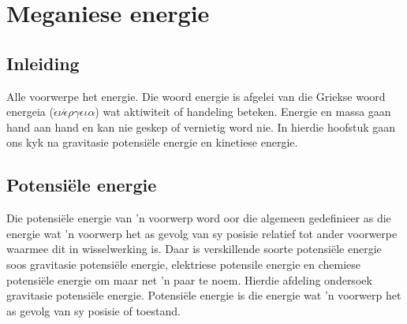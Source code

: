 \chapter{Meganiese energie} \label{chap:energy}
    \setcounter{figure}{1}
    \setcounter{subfigure}{1}
    \label{1fc5ba69690764517c30802fdf7b1905}
         \section{Inleiding}
    \nopagebreak
            \label{m38784*id7521}
Alle voorwerpe het energie. Die woord energie is afgelei van die Griekse woord energeia ($\acute{\epsilon} \nu \acute{\epsilon} \rho \gamma \epsilon \iota \alpha $) wat aktiwiteit of handeling beteken. Energie en massa gaan hand aan hand en kan nie geskep of vernietig word nie. In hierdie hoofstuk gaan ons kyk na gravitasie potensiële energie en kinetiese energie. \label{m38784*cid4}


\section{Potensi\"{e}le energie}
            \nopagebreak
Die potensi\"{e}le energie van   'n voorwerp word oor die algemeen gedefinieer as die energie wat   'n voorwerp het as gevolg van sy posisie relatief tot ander voorwerpe waarmee dit in wisselwerking is. Daar is verskillende soorte potensiële energie soos gravitasie potensi\"{e}le energie, elektriese potensile energie en chemiese potensiële energie om maar net   'n paar te noem. Hierdie afdeling ondersoek gravitasie potensi\"{e}le energie. 
 { Potensi\"{e}le energie is die energie wat   'n voorwerp het as gevolg van sy posisie of toestand.} 


